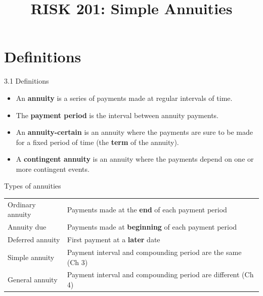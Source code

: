 \documentclass{beamer}
\title{RISK 201: Simple Annuities}
\begin{document}
\maketitle

\section{Definitions}

\begin{frame}{3.1 Definitions}

\begin{itemize}
\item An \textbf{annuity} is a series of payments made at regular intervals of time.
\medskip
\item The \textbf{payment period} is the interval between annuity payments.
\medskip
\item An \textbf{annuity-certain} is an annuity where the payments are sure to be made for a fixed period of time (the \textbf{term} of the annuity).
\medskip
\item A \textbf{contingent annuity} is an annuity where the payments depend on one or more contingent events.
\end{itemize}

\end{frame}

\begin{frame}{Types of annuities}

\renewcommand{\arraystretch}{1.5}
\begin{tabular}{@{}p{}p{}@{}}
\toprule
Ordinary annuity & Payments made at the \textbf{end} of each payment period \\
Annuity due & Payments made at \textbf{beginning} of each payment period \\
Deferred annuity & First payment at a \textbf{later} date \\
Simple annuity & Payment interval and compounding period are the same (Ch 3) \\
General annuity & Payment interval and compounding period are different (Ch 4) \\
\bottomrule
\end{tabular}

\end{frame}

\end{document}
